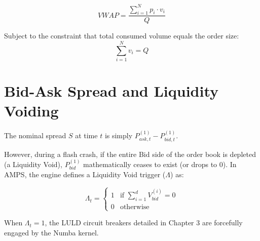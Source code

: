 \begin{equation}
    VWAP = \frac{\sum_{i=1}^{N} p_i \cdot v_i}{Q}
\end{equation}

Subject to the constraint that total consumed volume equals the order size:
\begin{equation}
    \sum_{i=1}^{N} v_i = Q
\end{equation}

\section{Bid-Ask Spread and Liquidity Voiding}

The nominal spread $S$ at time $t$ is simply $P_{ask, t}^{(1)} - P_{bid, t}^{(1)}$. 

However, during a flash crash, if the entire Bid side of the order book is depleted (a Liquidity Void), $P_{bid}^{(1)}$ mathematically ceases to exist (or drops to 0). In AMPS, the engine defines a Liquidity Void trigger ($\Lambda$) as:

\begin{equation}
    \Lambda_t = \begin{cases} 
      1 & \text{if } \sum_{i=1}^{d} V_{bid}^{(i)} = 0 \\
      0 & \text{otherwise}
   \end{cases}
\end{equation}

When $\Lambda_t = 1$, the LULD circuit breakers detailed in Chapter 3 are forcefully engaged by the Numba kernel.
